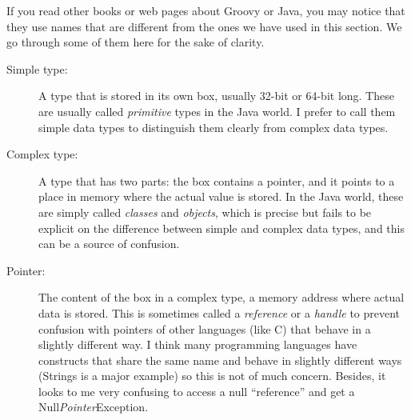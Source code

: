 If you read other books or web pages about Groovy or Java, you may
notice that they use names that are different from the ones we have
used in this section. We go through some of them here for the sake of
clarity. 

\begin{description}
\item[Simple type: ] A type that is stored in its own box, usually
  32-bit or 64-bit long. These are usually called \emph{primitive}
  types in the Java world. I prefer to call them simple data types to
  distinguish them clearly from complex data types.
\item[Complex type: ] A type that has two parts: the box contains a
  pointer, and it points to a place in memory where the actual value
  is stored. In the Java world, these are simply called \emph{classes}
  and \emph{objects}, which is precise but fails to be explicit on the
  difference between simple and complex data types, and this can be a
  source of confusion.
\item[Pointer: ] The content of the box in a complex type, a memory
  address where actual data is stored. This is sometimes called a
  \emph{reference} or a \emph{handle} to prevent confusion with
  pointers of other languages (like C) that behave in a slightly
  different way. I think many programming languages have constructs
  that share the same name and behave in slightly different ways
  (Strings is a major example) so this is not of much
  concern. Besides, it looks to me very confusing to access a null
  ``reference'' and get a Null\emph{Pointer}Exception.
\end{description}





